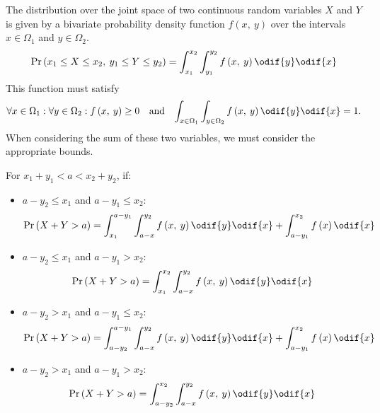 \documentclass{article}
\begin{document}
\begin{definition}
    The distribution over the joint space of two continuous random variables \(X\) and \(Y\) is  given by a
    bivariate probability density function \(f\left( x,\: y \right)\)
    over the intervals \(x \in \Omega_1\) and \(y \in \Omega_2\).
    \begin{equation*}
        \Pr{\left( x_1 \leq X \leq x_2,\: y_1 \leq Y \leq y_2 \right)} = \int_{x_1}^{x_2} \int_{y_1}^{y_2} f\left( x,\: y \right) \odif{y} \odif{x}
    \end{equation*}
    This function must satisfy
    \begin{align*}
        \forall x \in \Omega_1 : \forall y \in \Omega_2 : f\left( x,\: y \right) \geq 0 &  & \text{and} &  &
        \int_{x \in \Omega_1} \int_{y \in \Omega_2} f\left( x,\: y \right) \odif{y} \odif{x} = 1.
    \end{align*}
    When considering the sum of these two variables, we must consider the appropriate bounds.

    For \(x_1 + y_1 < a < x_2 + y_2\), if:
    \begin{itemize}
        \item \(a - y_2 \leq x_1\) and \(a - y_1 \leq x_2\):
              \begin{equation*}
                  \Pr{\left( X + Y > a \right)} = \int_{x_1}^{a - y_1} \int_{a - x}^{y_2} f\left( x,\: y \right) \odif{y} \odif{x} + \int_{a - y_1}^{x_2} f\left( x \right) \odif{x}
              \end{equation*}
        \item \(a - y_2 \leq x_1\) and \(a - y_1 > x_2\):
              \begin{equation*}
                  \Pr{\left( X + Y > a \right)} = \int_{x_1}^{x_2} \int_{a - x}^{y_2} f\left( x,\: y \right) \odif{y} \odif{x}
              \end{equation*}
        \item \(a - y_2 > x_1\) and \(a - y_1 \leq x_2\):
              \begin{equation*}
                  \Pr{\left( X + Y > a \right)} = \int_{a - y_2}^{a - y_1} \int_{a - x}^{y_2} f\left( x,\: y \right) \odif{y} \odif{x} + \int_{a - y_1}^{x_2} f\left( x \right) \odif{x}
              \end{equation*}
        \item \(a - y_2 > x_1\) and \(a - y_1 > x_2\):
              \begin{equation*}
                  \Pr{\left( X + Y > a \right)} = \int_{a - y_2}^{x_2} \int_{a - x}^{y_2} f\left( x,\: y \right) \odif{y} \odif{x}
              \end{equation*}
    \end{itemize}
\end{definition}
\end{document}
